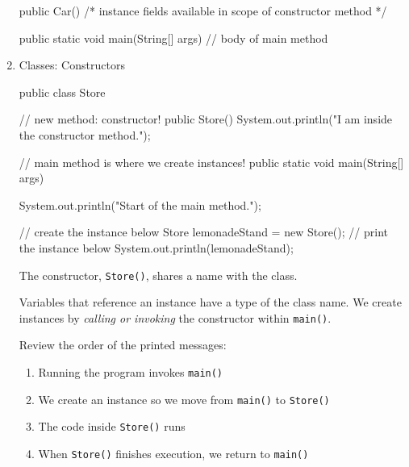 \documentclass[a4paper,12pt]{article}
\begin{document}
\begin{enumerate}
\begin{javacode}
{  public Car() {
    /* 
    instance fields available in
    scope of constructor method
    */
  }

  public static void main(String[] args) {
    // body of main method
  }
}
\end{javacode}

\item Classes: Constructors
\begin{javacode}
public class Store {
  
  // new method: constructor!
  public Store() {
    System.out.println("I am inside the constructor method.");
  }
  
  // main method is where we create instances!
  public static void main(String[] args) {
    System.out.println("Start of the main method.");
    
    // create the instance below
    Store lemonadeStand = new Store();
    // print the instance below
    System.out.println(lemonadeStand);
  }
}
\end{javacode}
The constructor, \verb|Store()|, shares a name with the class. 

Variables that reference an instance have a type of the class name. We create instances by \textit{calling or invoking} the constructor within \verb|main()|.

Review the order of the printed messages:
\renewcommand{\labelenumii}{$\diamond$}
\begin{enumerate}
\item Running the program invokes \verb|main()|

\item We create an instance so we move from \verb|main()| to \verb|Store()|

\item The code inside \verb|Store()| runs

\item When \verb|Store()| finishes execution, we return to \verb|main()|

\end{enumerate}


\end{enumerate}



\end{document}
